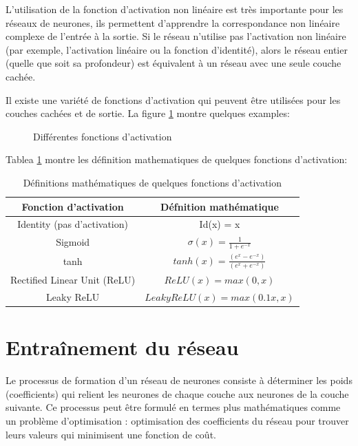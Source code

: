 L'utilisation de la fonction d'activation non linéaire est très importante pour les réseaux de neurones, ils permettent d'apprendre la correspondance non linéaire complexe de l'entrée à la sortie. Si le réseau n'utilise pas l'activation non linéaire (par exemple, l'activation linéaire ou la fonction d'identité), alors le réseau entier (quelle que soit sa profondeur) est équivalent à un réseau avec une seule couche cachée.

Il existe une variété de fonctions d'activation qui peuvent être utilisées pour les couches cachées et de sortie. La figure \ref{fig:activation-function} montre quelques examples:

\begin{figure}[h]
    \centering
	
    \caption{Différentes fonctions d'activation}
    \label{fig:activation-function}
\end{figure}

Tablea \ref{table:activation-functions} montre les définition mathematiques de quelques fonctions d'activation:

\begin{table}[h]
    \centering
    \begin{tabular}{c|c}
        \hline
        Fonction d'activation & Défnition mathématique \\
        \hline
        Identity (pas d'activation) & Id(x) = x \\
        Sigmoid & $\sigma(x)= \frac{1}{1+e^{-x}}$ \\
        tanh & $tanh(x)=\frac{(e^x-e^{-x})}{(e^x+e^{-x})}$\\
        Rectified Linear Unit (ReLU) & $ReLU(x)=max(0,x)$\\
        Leaky ReLU & $LeakyReLU(x)=max(0.1 x,x)$\\
    \hline
        
    \end{tabular}
    \caption{Définitions mathématiques de quelques fonctions d'activation}
    \label{table:activation-functions}
\end{table}

\section{Entraînement du réseau}
Le processus de formation d'un réseau de neurones consiste à déterminer les poids (coefficients) qui relient les neurones de chaque couche aux neurones de la couche suivante. Ce processus peut être formulé en termes plus mathématiques comme un problème d'optimisation : optimisation des coefficients du réseau pour trouver leurs valeurs qui minimisent une fonction de coût.

